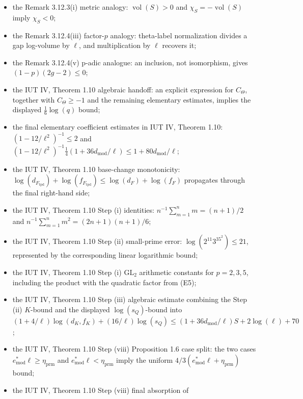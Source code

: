 \documentclass[11pt]{article}
\begin{document}
\begin{itemize}
  indeterminacy is absorbed by a hull upper ray, while one-column logarithmic
  conjugacy is absorbed as log-volume equality;
\item the Remark 3.12.3(i) metric analogy:
  \(\operatorname{vol}(S)>0\) and \(\chi_S=-\operatorname{vol}(S)\) imply
  \(\chi_S<0\);
\item the Remark 3.12.4(iii) factor-\(p\) analogy: theta-label normalization
  divides a gap log-volume by \(\ell\), and multiplication by \(\ell\) recovers it;
\item the Remark 3.12.4(v) p-adic analogue:
  an inclusion, not isomorphism, gives \((1-p)(2g-2)\le0\);
\item the IUT IV, Theorem 1.10 algebraic handoff: an explicit expression for
  \(C_\Theta\), together with \(C_\Theta\ge-1\) and the remaining elementary
  estimates, implies the displayed \(\frac16\log(q)\) bound;
\item the final elementary coefficient estimates in IUT IV, Theorem 1.10:
  \((1-12/\ell^2)^{-1}\le2\) and
  \((1-12/\ell^2)^{-1}\frac14(1+36d_{\mathrm{mod}}/\ell)
   \le 1+80d_{\mathrm{mod}}/\ell\);
\item the IUT IV, Theorem 1.10 base-change monotonicity:
  \(\log(d_{F_{\mathrm{tpd}}})+\log(f_{F_{\mathrm{tpd}}})
   \le \log(d_F)+\log(f_F)\) propagates through the final right-hand side;
\item the IUT IV, Theorem 1.10 Step (i) identities:
  \(n^{-1}\sum_{m=1}^n m=(n+1)/2\) and
  \(n^{-1}\sum_{m=1}^n m^2=(2n+1)(n+1)/6\);
\item the IUT IV, Theorem 1.10 Step (ii) small-prime error:
  \(\log(2^{11}3^35^2)\le21\), represented by the corresponding linear
  logarithmic bound;
\item the IUT IV, Theorem 1.10 Step (i) \(\mathrm{GL}_2\) arithmetic constants
  for \(p=2,3,5\), including the product with the quadratic factor from (E5);
\item the IUT IV, Theorem 1.10 Step (iii) algebraic estimate combining the
  Step (ii) \(K\)-bound and the displayed \(\log(s_Q)\)-bound into
  \((1+4/\ell)\log(d_K,f_K)+(16/\ell)\log(s_Q)
   \le (1+36d_{\mathrm{mod}}/\ell)S+2\log(\ell)+70\);
\item the IUT IV, Theorem 1.10 Step (viii) Proposition 1.6 case split:
  the two cases \(e^*_{\mathrm{mod}}\ell\ge\eta_{\mathrm{prm}}\) and
  \(e^*_{\mathrm{mod}}\ell<\eta_{\mathrm{prm}}\) imply the uniform
  \(4/3(e^*_{\mathrm{mod}}\ell+\eta_{\mathrm{prm}})\) bound;
\item the IUT IV, Theorem 1.10 Step (viii) final absorption of

\end{itemize}
\end{document}
